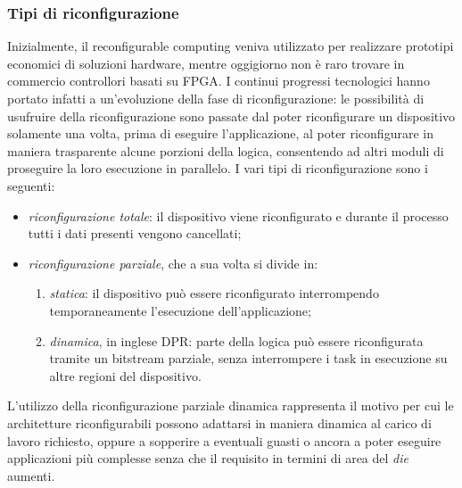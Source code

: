 \subsubsection{Tipi di riconfigurazione}
Inizialmente, il reconfigurable computing veniva utilizzato per realizzare prototipi
economici di soluzioni hardware, mentre oggigiorno non \`e raro trovare in commercio
controllori basati su \ac{FPGA}. I continui progressi tecnologici hanno portato infatti
a un'evoluzione della fase di riconfigurazione: le possibilit\`a di usufruire della
riconfigurazione sono passate dal poter riconfigurare un dispositivo solamente una volta,
prima di eseguire l'applicazione, al poter riconfigurare in maniera trasparente alcune porzioni
della logica, consentendo ad altri moduli di proseguire la loro esecuzione in parallelo.
I vari tipi di riconfigurazione sono i seguenti:
\begin{itemize}
 \item \emph{riconfigurazione totale}: il dispositivo viene riconfigurato e durante
   il processo tutti i dati presenti vengono cancellati;
 \item \emph{riconfigurazione parziale}, che a sua volta si divide in:
     \begin{enumerate}
        \item \emph{statica}: il dispositivo può essere riconfigurato
interrompendo temporaneamente l'esecuzione dell'applicazione;
        \item \emph{dinamica}, in inglese \acf{DPR}: parte della logica
può essere riconfigurata tramite un bitstream parziale, senza interrompere i task in
esecuzione su altre regioni del dispositivo.
    \end{enumerate}
\end{itemize}
L'utilizzo della riconfigurazione parziale dinamica rappresenta il motivo per cui le
architetture riconfigurabili possono adattarsi in maniera dinamica al carico di lavoro richiesto,
oppure a sopperire a eventuali guasti o ancora a poter eseguire applicazioni pi\`u complesse
senza che il requisito in termini di area del \emph{die} aumenti.


